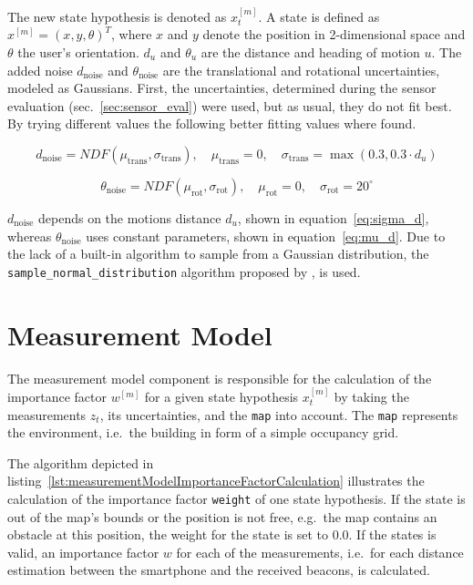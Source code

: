 \noindent The new state hypothesis is denoted as $x^{[m]}_t$. A state is defined as $x^{[m]} = (x, y, \theta)^T$, where $x$ and $y$ denote the position in 2-dimensional space and $\theta$ the user's orientation. $d_u$ and $\theta_u$ are the distance and heading of motion $u$. The added noise $d_\text{noise}$ and $\theta_\text{noise}$ are the translational and rotational uncertainties, modeled as Gaussians. First, the uncertainties, determined during the sensor evaluation (sec.~\ref{sec:sensor_eval}) were used, but as usual, they do not fit best. By trying different values the following better fitting values where found.

\begin{equation}\label{eq:sigma_d}
	d_\text{noise} = NDF(\mu_\text{trans}, \sigma_\text{trans}) ,
	\quad \mu_\text{trans} = 0 ,
	 \quad \sigma_{\text{trans}} = \max(0.3, 0.3 \cdot d_u)
\end{equation}

\begin{equation}\label{eq:mu_d}
	\theta_\text{noise} = NDF(\mu_\text{rot}, \sigma_\text{rot}), \quad
	\mu_\text{rot} = 0 , \quad
	\sigma_\text{rot} = 20^{\circ}
\end{equation}

\noindent $d_\text{noise}$ depends on the motions distance $d_u$, shown in equation~\ref{eq:sigma_d}, whereas $\theta_\text{noise}$ uses constant parameters, shown in equation~\ref{eq:mu_d}. Due to the lack of a built-in algorithm to sample from a Gaussian distribution, the \texttt{sample\_normal\_distribution} algorithm proposed by \citet[p.~124]{thrun:prob_robo}, is used.


\section{Measurement Model}\label{sec:algo_measurement_model}
The measurement model component is responsible for the calculation of the importance factor $w^{[m]}$ for a given state hypothesis $x^{[m]}_t$ by taking the measurements $z_t$, its uncertainties, and the \texttt{map} into account. The \texttt{map} represents the environment, i.e.\ the building in form of a simple occupancy grid.

The algorithm depicted in listing~\ref{lst:measurementModelImportanceFactorCalculation} illustrates the calculation of the importance factor \texttt{weight} of one state hypothesis. If the state is out of the map's bounds or the position is not free, e.g.\ the map contains an obstacle at this position, the weight for the state is set to 0.0. If the states is valid, an importance factor $w$ for each of the measurements, i.e.\ for each distance estimation between the smartphone and the received beacons, is calculated.

